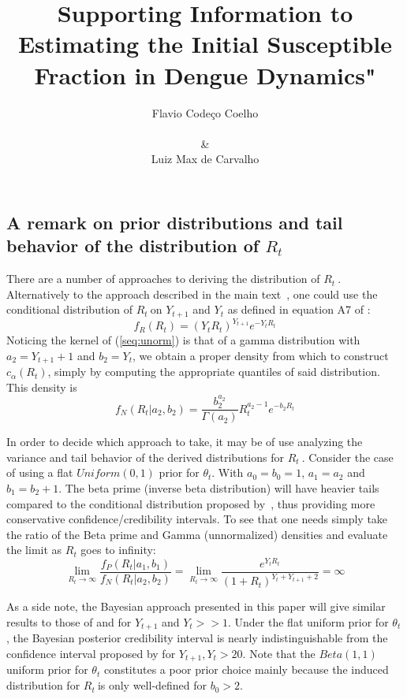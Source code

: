 \documentclass[12pt]{article}
\title{
Supporting Information to Estimating the Initial Susceptible Fraction in Dengue Dynamics"
}
\author{
Flavio Code\c{c}o Coelho \\
\\
\& \\
Luiz Max de Carvalho \\
}
\date{}
\def \rr {$R_{t}\ $}
\begin{document}
                                  
% 

%
\maketitle

\subsection*{A remark on prior distributions and tail behavior of the 
distribution of $R_t$}
\label{sec:tails}
There are a number of approaches to deriving the distribution of \rr.
Alternatively to the approach described in the main text~\citep{mantel}, one 
could use the conditional distribution of \rr on 
$Y_{t+1}$ and $Y_t$ as defined in equation A7 of \citet{nishiura}:
\begin{equation}
\label{seq:unorm}
f_{R}(R_{t}) = (Y_tR_{t})^{Y_{t+1}} e^{-Y_tR_{t}}
\end{equation}
Noticing the kernel of (\ref{seq:unorm}) is that of a gamma distribution with 
$a_2 = Y_{t+1}+1$ and $b_2 = Y_t$, we obtain a proper density from which to 
construct $c_{\alpha}(R_t)$, simply by computing the appropriate quantiles of 
said distribution.
 This density is
\begin{equation}
\label{seq:densityNishiura}
f_N(R_t| a_2, b_2) =  \frac{b_2^{a_2}}{\Gamma(a_2)} R_t^{a_2-1} e^{-b_2 R_t}
\end{equation}

In order to decide which approach to take, it may be of use analyzing the 
variance and tail behavior of the derived distributions for \rr. 
Consider the case of using a flat $Uniform(0, 1)$ prior for $\theta_t$.
With $a_0 = b_0 = 1$, $a_1 = a_2$ and $b_1 = b_2 + 1$.
The beta prime (inverse beta distribution) will have heavier tails compared to 
the conditional distribution proposed by~\citet{nishiura}, thus providing more 
conservative confidence/credibility intervals.
To see that one needs simply take the ratio of the Beta prime and Gamma 
(unnormalized) densities and evaluate the limit as $R_t$ goes to infinity:
\begin{equation}
 \label{seq:densityratio}
 \lim_{R_t\to\infty}\frac{f_P(R_t| a_1, b_1)}{f_N(R_t| a_2, b_2)} =  
\lim_{R_t\to\infty}\frac{e^{Y_{t}R_t}}{(1 +R_t)^{Y_{t} + Y_{t +1}+2}} = \infty
\end{equation}



As a side note, the Bayesian approach presented in this 
paper will give similar results to those of 
\citet{wilson} and \citet{wilson} for $Y_{t+1}$ and $Y_t >> 1$.
Under the flat  uniform prior for $\theta_t$, the Bayesian posterior credibility 
interval is nearly indistinguishable from the confidence interval proposed by 
\citet{clopper} for $Y_{t+1}, Y_t > 20$.
Note that the $Beta(1, 1)$ uniform prior for $\theta_t$ constitutes a poor prior 
choice mainly because the induced distribution for \rr is only well-defined for 
$b_0 > 2$.
\end{document}
